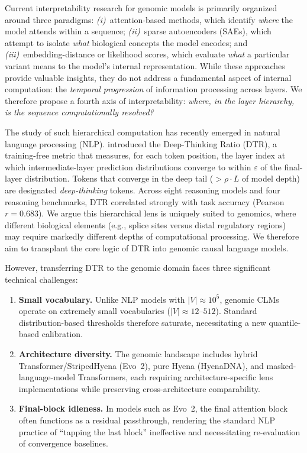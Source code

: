 \documentclass[12pt]{article}
\theoremstyle{plain}
\theoremstyle{definition}
\theoremstyle{remark}
\newcommand{\DTR}{\textsc{DTR}}
\begin{document}
Current interpretability research for genomic models is primarily
organized around three paradigms: \emph{(i)}~attention-based methods,
which identify \emph{where} the model attends within a sequence;
\emph{(ii)}~sparse autoencoders (SAEs), which attempt to isolate
\emph{what} biological concepts the model encodes; and
\emph{(iii)}~embedding-distance or likelihood scores, which evaluate
\emph{what} a particular variant means to the model's internal
representation. While these approaches provide valuable insights, they
do not address a fundamental aspect of internal computation:
the \emph{temporal progression} of information processing across
layers. We therefore propose a fourth axis of interpretability:
\emph{where, in the layer hierarchy, is the sequence computationally
resolved?}

The study of such hierarchical computation has recently emerged in
natural language processing (NLP). \citet{chen2026deepthinking}
introduced the Deep-Thinking Ratio (\DTR{}), a training-free metric
that measures, for each token position, the layer index at which
intermediate-layer prediction distributions converge to within
$\varepsilon$ of the final-layer distribution. Tokens that converge in
the deep tail ($> \rho \cdot L$ of model depth) are designated
\emph{deep-thinking} tokens. Across eight reasoning models and four
reasoning benchmarks, \DTR{} correlated strongly with task accuracy
(Pearson $r = 0.683$). We argue this hierarchical lens is uniquely
suited to genomics, where different biological elements (e.g., splice
sites versus distal regulatory regions) may require markedly different
depths of computational processing. We therefore aim to transplant the
core logic of \DTR{} into genomic causal language models.

However, transferring \DTR{} to the genomic domain faces three
significant technical challenges:
\begin{enumerate}
  \item \textbf{Small vocabulary.} Unlike NLP models with $|V|\approx
        10^5$, genomic CLMs operate on extremely small vocabularies
        ($|V|\approx 12$--$512$). Standard distribution-based thresholds
        therefore saturate, necessitating a new quantile-based
        calibration.
  \item \textbf{Architecture diversity.} The genomic landscape includes
        hybrid Transformer/StripedHyena (Evo~2), pure Hyena (HyenaDNA),
        and masked-language-model Transformers, each requiring
        architecture-specific lens implementations while preserving
        cross-architecture comparability.
  \item \textbf{Final-block idleness.} In models such as Evo~2, the
        final attention block often functions as a residual passthrough,
        rendering the standard NLP practice of ``tapping the last
        block'' ineffective and necessitating re-evaluation of
        convergence baselines.
\end{enumerate}
\end{document}
